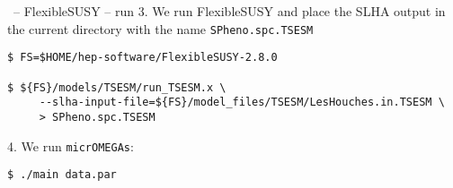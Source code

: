 \documentclass[11pt]{beamer}
\newcommand{\micrOMEGAs}{\texttt{micrOMEGAs}}
\begin{document}

\begin{frame}[fragile]{\insertsection\ -- FlexibleSUSY -- run}
  3. We run FlexibleSUSY and place the SLHA output in the current
  directory with the name \texttt{SPheno.spc.TSESM}
  \begin{lstlisting}
$ FS=$HOME/hep-software/FlexibleSUSY-2.8.0

$ ${FS}/models/TSESM/run_TSESM.x \
     --slha-input-file=${FS}/model_files/TSESM/LesHouches.in.TSESM \
     > SPheno.spc.TSESM\end{lstlisting}%
  4. We run \micrOMEGAs:
  \begin{lstlisting}
$ ./main data.par\end{lstlisting}%
\end{frame}


\end{document}
